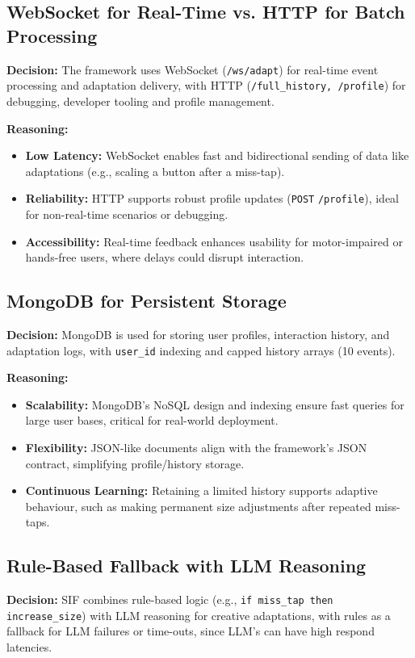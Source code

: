 \documentclass[openany]{book}
\begin{document}
\subsection{WebSocket for Real-Time vs. HTTP for Batch Processing}
\textbf{Decision:} The framework uses WebSocket (\texttt{/ws/adapt}) for real-time event processing and adaptation delivery, with HTTP (\texttt{/full\_history, /profile}) for debugging, developer tooling and profile management.

\textbf{Reasoning:}
\begin{itemize}
    \item \textbf{Low Latency:} WebSocket enables fast and bidirectional sending of data like adaptations (e.g., scaling a button after a miss-tap).
    \item \textbf{Reliability:} HTTP supports robust profile updates (\texttt{POST} \texttt{/profile}), ideal for non-real-time scenarios or debugging.
    \item \textbf{Accessibility:} Real-time feedback enhances usability for motor-impaired or hands-free users, where delays could disrupt interaction. 
\end{itemize}

\subsection{MongoDB for Persistent Storage}
\textbf{Decision:} MongoDB is used for storing user profiles, interaction history, and adaptation logs, with \texttt{user\_id} indexing and capped history arrays (10 events).

\textbf{Reasoning:}
\begin{itemize}
  \item \textbf{Scalability:} MongoDB’s NoSQL design and indexing ensure fast queries for large user bases, critical for real-world deployment.
  \item \textbf{Flexibility:} JSON-like documents align with the framework’s JSON contract, simplifying profile/history storage.
  \item \textbf{Continuous Learning:} Retaining a limited history supports adaptive behaviour, such as making permanent size adjustments after repeated miss-taps.
\end{itemize}

\subsection{Rule-Based Fallback with LLM Reasoning}
\textbf{Decision:} SIF combines rule-based logic (e.g., \texttt{if miss\_tap then increase\_size}) with LLM reasoning for creative adaptations, with rules as a fallback for LLM failures or time-outs, since LLM's can have high respond latencies.
\end{document}
